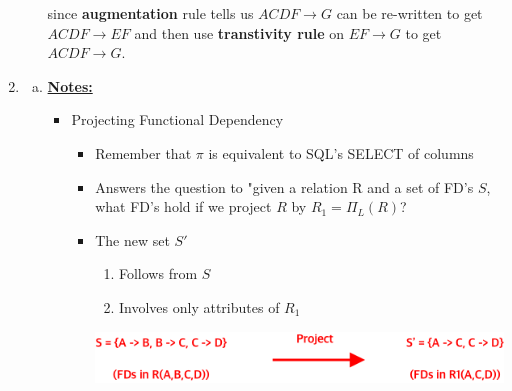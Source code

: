 \documentclass[12pt]{article}
\begin{document}
\begin{enumerate}[1.]
\begin{itemize}
            since \textbf{augmentation} rule tells us $ACDF \to G$ can be
            re-written to get $ACDF \to EF$ and then use \textbf{transtivity rule}
            on $EF \to G$ to get $ACDF \to G$.

        \end{itemize}

    \item

    \begin{enumerate}[a)]
        \item

        \bigskip

        \underline{\textbf{Notes:}}

        \bigskip

        \begin{itemize}
            \item Projecting Functional Dependency
            \begin{itemize}
                \item Remember that $\pi$ is equivalent to SQL's SELECT of columns
                \item Answers the question to "given a relation R and a set of FD's $S$,
                what FD's hold if we project $R$ by $R_1 = \Pi_L(R)$?
                \item The new set $S'$
                \begin{enumerate}[1.]
                    \item Follows from $S$
                    \item Involves only attributes of $R_1$
                \end{enumerate}

                \bigskip

                \begin{center}
                \includegraphics[width=0.7\linewidth]{images/worksheet_12_solution_2.png}
                \end{center}
            \end{itemize}


\end{itemize}
\end{enumerate}
\end{enumerate}
\end{document}
